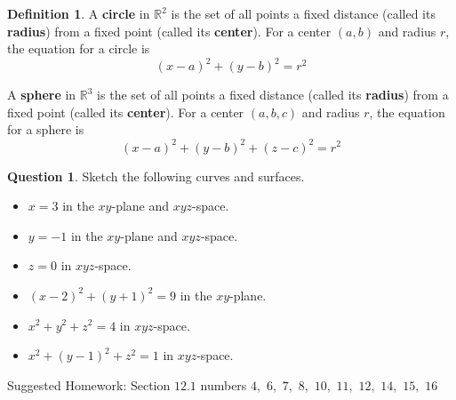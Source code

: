 \documentclass[letterpaper, twoside, 12pt]{book}
\newcommand{\<}{\langle}
\renewcommand{\>}{\rangle}
\theoremstyle{definition}
\theoremstyle{definition}
\newtheorem{definition}[theorem]{Definition}
\newtheorem{question}[theorem]{Question}
\newcommand{\harpvec}[1]{\overrightharp{\ensuremath{\mathbf{#1}}}}
\begin{document}
\begin{definition}
  A \textbf{circle} in $\mathbb{R}^2$ is the set of all points a fixed distance
  (called its \textbf{radius}) from a fixed point (called its \textbf{center}).
  For a center $(a,b)$ and radius $r$, the equation for a circle is
  \[
    (x-a)^2+(y-b)^2=r^2
  \]

  A \textbf{sphere} in $\mathbb{R}^3$ is the set of all points a fixed distance
  (called its \textbf{radius}) from a fixed point (called its \textbf{center}).
  For a center $(a,b,c)$ and radius $r$, the equation for a sphere is
  \[
    (x-a)^2+(y-b)^2+(z-c)^2=r^2
  \]
\end{definition}

\begin{question}
  Sketch the following curves and surfaces.
  \begin{itemize}
    \item $x=3$ in the $xy$-plane and $xyz$-space.
    \item $y=-1$ in the $xy$-plane and $xyz$-space.
    \item $z=0$ in $xyz$-space.
    \item $(x-2)^2+(y+1)^2=9$ in the $xy$-plane.
    \item $x^2+y^2+z^2=4$ in $xyz$-space.
    \item $x^2+(y-1)^2+z^2=1$ in $xyz$-space.
  \end{itemize}
\end{question}

\vfill

\noindent Suggested Homework:
Section $12.1$ numbers $4,$ $6,$ $7,$ $8,$ $10,$ $11,$ $12,$ $14,$ $15,$ $16$




\end{document}
